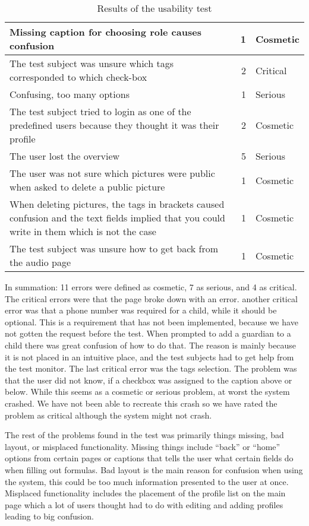 \begin{table}[H]
\begin{tabular}{|p{7cm}|r|l|}
		Missing caption for choosing role causes confusion & 1 & Cosmetic \\ \hline
		The test subject was unsure which tags corresponded to which check-box & 2 & Critical \\ \hline
		Confusing, too many options & 1 & Serious \\ \hline
		The test subject tried to login as one of the predefined users because they thought it was their profile & 2 & Cosmetic \\ \hline
		The user lost the overview & 5 & Serious \\ \hline
		The user was not sure which pictures were public when asked to delete a public picture & 1 & Cosmetic \\ \hline
		When deleting pictures, the tags in brackets caused confusion and the text fields implied that you could write in them which is not the case & 1 & Cosmetic \\ \hline
		The test subject was unsure how to get back from the audio page & 1 & Cosmetic \\
		\hline
	\end{tabular}
	\caption{Results of the usability test}
	\label{tab:results}
\end{table}

In summation: 11 errors were defined as cosmetic, 7 as serious, and 4 as critical. \\

The critical errors were that the page broke down with an error. another critical error was that a phone number was required for a child, while it should be optional.
This is a requirement that has not been implemented, because we have not gotten the request before the test.
When prompted to add a guardian to a child there was great confusion of how to do that.
The reason is mainly because it is not placed in an intuitive place, and the test subjects had to get help from the test monitor.
The last critical error was the tags selection. The problem was that the user did not know, if a checkbox was assigned to the caption above or below. While this seems as a cosmetic or serious problem, at worst the system crashed. We have not been able to recreate this crash so we have rated the problem as critical although the system might not crash.

The rest of the problems found in the test was primarily things missing, bad layout, or misplaced functionality.
Missing things include ``back'' or ``home'' options from certain pages or captions that tells the user what certain fields do when filling out formulas. Bad layout is the main reason for confusion when using the system, this could be too much information presented to the user at once.
Misplaced functionality includes the placement of the profile list on the main page which a lot of users thought had to do with editing and adding profiles leading to big confusion. 